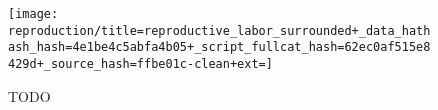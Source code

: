 \begin{figure}[!htbp]
\begin{center}

\texttt{[image: reproduction/title=reproductive\_labor\_surrounded+\_data\_hathash\_hash=4e1be4c5abfa4b05+\_script\_fullcat\_hash=62ec0af515e8429d+\_source\_hash=ffbe01c-clean+ext=]}

\caption{
TODO
}
\label{fig:reproduction_surrounted}
\end{center}
\end{figure}
